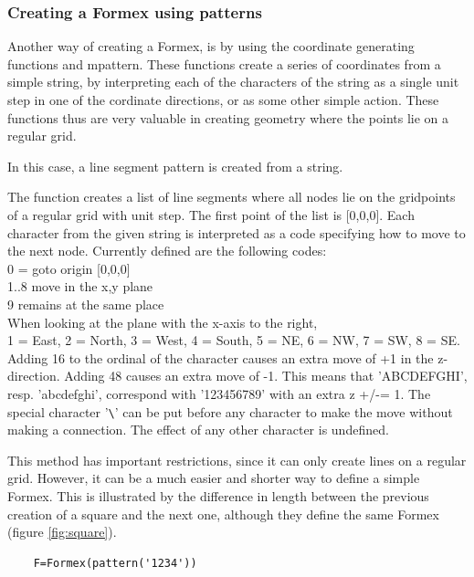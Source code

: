 \subsubsection{Creating a Formex using patterns}

Another way of creating a Formex, is by using the coordinate generating functions  and {mpattern}. These functions create a series of coordinates from a simple string, by interpreting each of the characters of the string as a single unit step in one of the cordinate directions, or as some other simple action. These functions thus are very valuable in creating geometry where the points lie on a regular grid.

 


In this case, a line segment pattern is created from a string.

The function  creates a list of line segments where all nodes lie on the
gridpoints of a regular grid with unit step.
The first point of the list is [0,0,0]. Each character from the given
string  is interpreted as a code specifying how to move to the next node.
Currently defined are the following codes:\\
    0 = goto origin [0,0,0]\\
    1..8 move in the x,y plane\\
    9 remains at the same place\\
    When looking at the plane with the x-axis to the right,\\
    1 = East, 2 = North, 3 = West, 4 = South, 5 = NE, 6 = NW, 7 = SW, 8 = SE.\\
    Adding 16 to the ordinal of the character causes an extra move of +1 in
    the z-direction. Adding 48 causes an extra move of -1. This means that
    'ABCDEFGHI', resp. 'abcdefghi', correspond with '123456789' with an extra
    z +/-= 1.              
    The special character '\verb?\?' can be put before any character to make the
    move without making a connection.
    The effect of any other character is undefined.

This method has important restrictions, since it can only create lines on a regular grid. However, it can be a much easier and shorter way to define a simple Formex. This is illustrated by the difference in length between the previous creation of a square and the next one, although they define the same Formex (figure \ref{fig:square}).
\begin{verbatim}
	F=Formex(pattern('1234'))
\end{verbatim}

